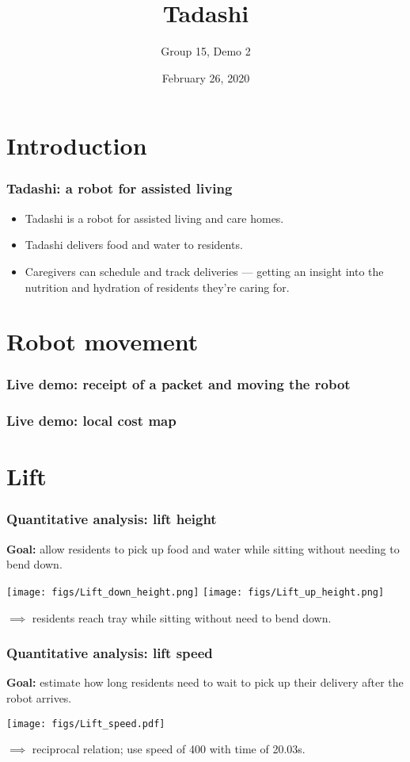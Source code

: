 \documentclass{beamer}
\title{Tadashi}
\subtitle{Group 15, Demo 2}
\institute{\vspace{2em}\texttt{[image: figs/logo.png]}}
\date{February 26, 2020}
\begin{document}
\maketitle
\section{Introduction}
\begin{frame}
  \frametitle{Tadashi: a robot for assisted living}
  \begin{itemize}
    \item Tadashi is a robot for assisted living and care homes.
    \item Tadashi delivers food and water to residents.
    \item Caregivers can schedule and track deliveries --- getting an insight into the nutrition and hydration of residents they're caring for.
  \end{itemize}
\end{frame}

\section{Robot movement}
\begin{frame}
  \frametitle{Live demo: receipt of a packet and moving the robot}
\end{frame}
\begin{frame}
  \frametitle{Live demo: local cost map}
\end{frame}

\section{Lift}
\begin{frame}
  \frametitle{Quantitative analysis: lift height}
  {\bf Goal: } allow residents to pick up food and water while sitting without needing to bend down.
  \begin{center}
    \texttt{[image: figs/Lift\_down\_height.png]}
    \texttt{[image: figs/Lift\_up\_height.png]}
  \end{center}
  $\implies$ residents reach tray while sitting without need to bend down. 
\end{frame}

\begin{frame}
  \frametitle{Quantitative analysis: lift speed}
  {\bf Goal: } estimate how long residents need to wait to pick up their delivery after the robot arrives.
  \begin{center}
    \texttt{[image: figs/Lift\_speed.pdf]}
  \end{center}
  $\implies$ reciprocal relation; use speed of 400 with time of 20.03s.
\end{frame}
\end{document}
